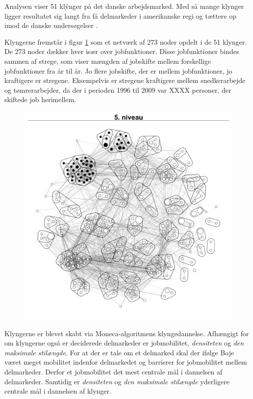 Analysen viser 51 klýnger på det danske arbejdsmarked. Med så mange klynger ligger resultatet sig langt fra få delmarkeder i amerikanske regi \parencite{Piore1980, Gordon1982} og tættere op imod de danske undersøgelser \parencite{Boje1985, Touboel2013}.

Klyngerne fremstår i figur \ref{fig_delanalyse1_kort_seg_proces5} som et netværk af 273 noder opdelt i de 51 klynger. De 273 noder dækker hver især over jobfunktioner. Disse jobfunktioner bindes sammen af strege, som viser mængden af jobskifte mellem forskellige jobfunktioner fra år til år. Jo flere jobskifte, der er mellem jobfunktioner, jo kraftigere er stregene. Eksempelvis er stregene kraftigere mellem snedkerarbejde og tømrerarbejder, da der i perioden 1996 til 2009 var XXXX personer, der skiftede job herimellem.

\begin{figure}[H]
\begin{centering}
  \includegraphics[width=10 cm]{fig/netvaerkskort/kort_seg_proces5.pdf}
  \label{fig_delanalyse1_kort_seg_proces5}
  \caption{}
\end{centering}
\end{figure}

Klyngerne er blevet skabt via Moneca-algoritmens klyngedannelse. Afhængigt for om klyngerne også er deciderede delmarkeder er jobmobilitet, \emph{densiteten} og \emph{den maksimale stilængde}. For at der er tale om et delmarked skal der ifølge Boje været meget mobilitet indenfor delmarkedet og barrierer for jobmobilitet mellem  delmarkeder. Derfor et jobmobilitet det mest centrale mål i dannelsen af delmarkeder. Samtidig er \emph{densiteten} og \emph{den maksimale stilængde} yderligere centrale mål i dannelsen af klynger.

